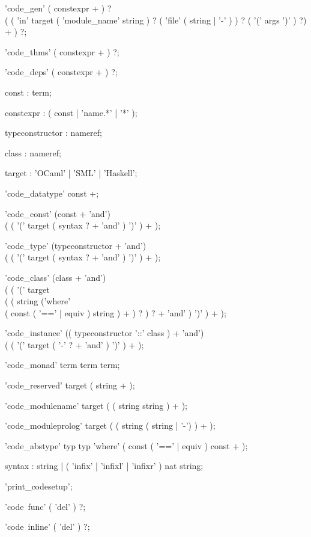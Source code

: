 \begin{rail}
'code\_gen' ( constexpr + ) ? \\
  ( ( 'in' target ( 'module_name' string ) ? ( 'file' ( string | '-' ) ) ? ( '(' args ')' ) ?) + ) ?;

'code\_thms' ( constexpr + ) ?;

'code\_deps' ( constexpr + ) ?;

const : term;

constexpr : ( const | 'name.*' | '*' );

typeconstructor : nameref;

class : nameref;

target : 'OCaml' | 'SML' | 'Haskell';

'code\_datatype' const +;

'code\_const' (const + 'and') \\
  ( ( '(' target ( syntax ? + 'and' ) ')' ) + );

'code\_type' (typeconstructor + 'and') \\
  ( ( '(' target ( syntax ? + 'and' ) ')' ) + );

'code\_class' (class + 'and') \\
  ( ( '(' target \\
    ( ( string ('where' \\
      ( const ( '==' | equiv ) string ) + ) ? ) ? + 'and' ) ')' ) + );

'code\_instance' (( typeconstructor '::' class ) + 'and') \\
  ( ( '(' target ( '-' ? + 'and' ) ')' ) + );

'code\_monad' term term term;

'code\_reserved' target ( string + );

'code\_modulename' target ( ( string string ) + );

'code\_moduleprolog' target ( ( string ( string | '-') ) + );

'code\_abstype' typ typ 'where' ( const ( '==' | equiv ) const + );

syntax : string | ( 'infix' | 'infixl' | 'infixr' ) nat string;

'print\_codesetup';

'code\ func' ( 'del' ) ?;

'code\ inline' ( 'del' ) ?;
\end{rail}

